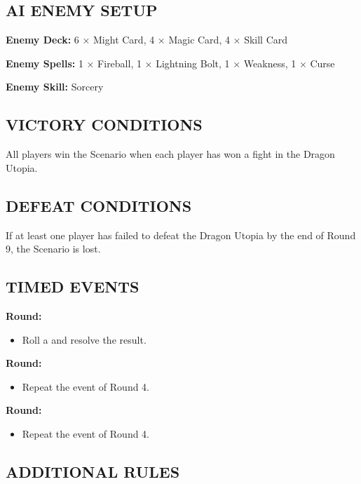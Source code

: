 \begin{multicols}{2}
\subsection*{\MakeUppercase{AI Enemy Setup}}

\textbf{Enemy Deck:} 6 × Might Card, 4 × Magic Card, 4 × Skill Card

\textbf{Enemy Spells:} 1 × Fireball, 1 × Lightning Bolt, 1 × Weakness, 1 × Curse

\textbf{Enemy Skill:} Sorcery

\subsection*{\MakeUppercase{Victory Conditions}}

All players win the Scenario when each player has won a fight in the Dragon Utopia.

\subsection*{\MakeUppercase{Defeat Conditions}}

If at least one player has failed to defeat the Dragon Utopia by the end of Round 9, the Scenario is lost.

\subsection*{\MakeUppercase{Timed Events}}
\textbf{ Round:}
\begin{itemize}
  \item Roll a  and resolve the result.
\end{itemize}
\textbf{ Round:}
\begin{itemize}
  \item Repeat the event of Round 4.
\end{itemize}
\textbf{ Round:}
\begin{itemize}
  \item Repeat the event of Round 4.
\end{itemize}

\subsection*{\MakeUppercase{Additional Rules}}


\end{multicols}
